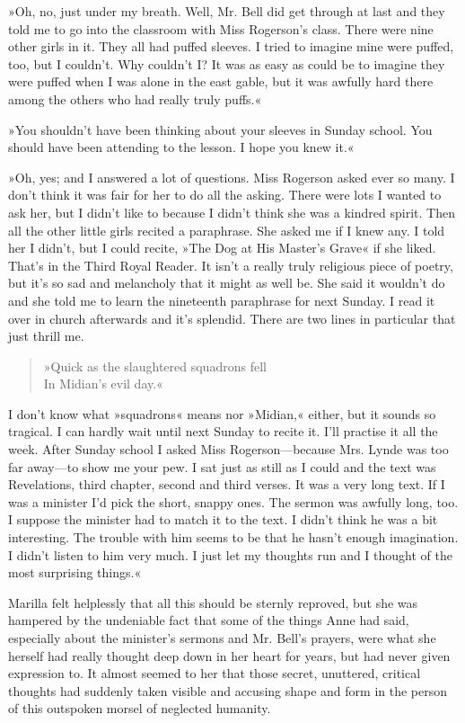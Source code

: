 »Oh, no, just under my breath. Well, Mr. Bell did get through at last and they told me to go into the classroom with Miss Rogerson’s class. There were nine other girls in it. They all had puffed sleeves. I tried to imagine mine were puffed, too, but I couldn’t. Why couldn’t I? It was as easy as could be to imagine they were puffed when I was alone in the east gable, but it was awfully hard there among the others who had really truly puffs.«

»You shouldn’t have been thinking about your sleeves in Sunday school. You should have been attending to the lesson. I hope you knew it.«

»Oh, yes; and I answered a lot of questions. Miss Rogerson asked ever so many. I don’t think it was fair for her to do all the asking. There were lots I wanted to ask her, but I didn’t like to because I didn’t think she was a kindred spirit. Then all the other little girls recited a paraphrase. She asked me if I knew any. I told her I didn’t, but I could recite, »The Dog at His Master's Grave« if she liked. That’s in the Third Royal Reader. It isn’t a really truly religious piece of poetry, but it’s so sad and melancholy that it might as well be. She said it wouldn’t do and she told me to learn the nineteenth paraphrase for next Sunday. I read it over in church afterwards and it’s splendid. There are two lines in particular that just thrill me.

\begin{verse}
»Quick as the slaughtered squadrons fell\\
In Midian’s evil day.«
\end{verse}

I don’t know what »squadrons« means nor »Midian,« either, but it sounds so tragical. I can hardly wait until next Sunday to recite it. I’ll practise it all the week. After Sunday school I asked Miss Rogerson—because Mrs. Lynde was too far away—to show me your pew. I sat just as still as I could and the text was Revelations, third chapter, second and third verses. It was a very long text. If I was a minister I’d pick the short, snappy ones. The sermon was awfully long, too. I suppose the minister had to match it to the text. I didn’t think he was a bit interesting. The trouble with him seems to be that he hasn’t enough imagination. I didn’t listen to him very much. I just let my thoughts run and I thought of the most surprising things.«

Marilla felt helplessly that all this should be sternly reproved, but she was hampered by the undeniable fact that some of the things Anne had said, especially about the minister’s sermons and Mr. Bell’s prayers, were what she herself had really thought deep down in her heart for years, but had never given expression to. It almost seemed to her that those secret, unuttered, critical thoughts had suddenly taken visible and accusing shape and form in the person of this outspoken morsel of neglected humanity.